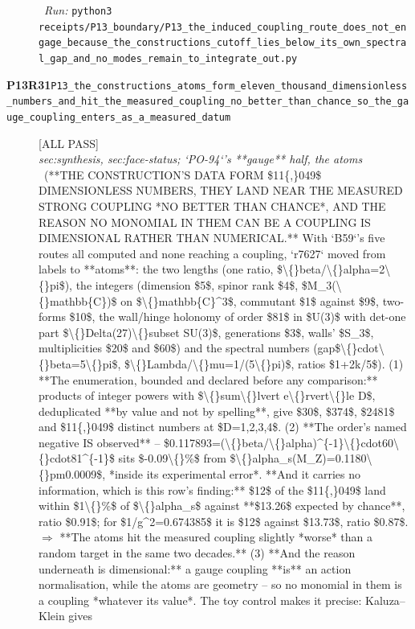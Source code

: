\begin{description}
\ \emph{Run:} \texttt{python3 receipts/P13\_boundary/P13\_the\_induced\_coupling\_route\_does\_not\_engage\_because\_the\_constructions\_cutoff\_lies\_below\_its\_own\_spectral\_gap\_and\_no\_modes\_remain\_to\_integrate\_out.py}
\item[\rcptlabel{P13_the_constructions_atoms_form_eleven_thousand_dimensionless_numbers_and_hit_the_measured_coupling_no_better_than_chance_so_the_gauge_coupling_enters_as_a_measured_datum}{P13R31}\textbf{P13R31}\quad\texttt{P13\_the\_constructions\_atoms\_form\_eleven\_thousand\_dimensionless\_numbers\_and\_hit\_the\_measured\_coupling\_no\_better\_than\_chance\_so\_the\_gauge\_coupling\_enters\_as\_a\_measured\_datum}]\hfill\textsf{[ALL PASS]}\\
\textit{sec:synthesis, sec:face-status; `PO-94`'s **gauge** half, the atoms} \ (**THE CONSTRUCTION'S DATA FORM \$11\{,\}049\$ DIMENSIONLESS NUMBERS, THEY LAND NEAR THE MEASURED STRONG COUPLING *NO BETTER THAN CHANCE*, AND THE REASON NO MONOMIAL IN THEM CAN BE A COUPLING IS DIMENSIONAL RATHER THAN NUMERICAL.** With `B59`'s five routes all computed and none reaching a coupling, `r7627` moved from labels to **atoms**: the two lengths (one ratio, \$\textbackslash\{\}beta/\textbackslash\{\}alpha=2\textbackslash\{\}pi\$), the integers (dimension \$5\$, spinor rank \$4\$, \$M\_3(\textbackslash\{\}mathbb\{C\})\$ on \$\textbackslash\{\}mathbb\{C\}\textasciicircum{}3\$, commutant \$1\$ against \$9\$, two-forms \$10\$, the wall/hinge holonomy of order \$81\$ in \$U(3)\$ with det-one part \$\textbackslash\{\}Delta(27)\textbackslash\{\}subset SU(3)\$, generations \$3\$, walls' \$S\_3\$, multiplicities \$20\$ and \$60\$) and the spectral numbers (gap\$\textbackslash\{\}cdot\textbackslash\{\}beta=5\textbackslash\{\}pi\$, \$\textbackslash\{\}Lambda/\textbackslash\{\}mu=1/(5\textbackslash\{\}pi)\$, ratios \$1+2k/5\$). (1) **The enumeration, bounded and declared before any comparison:** products of integer powers with \$\textbackslash\{\}sum\textbackslash\{\}lvert e\textbackslash\{\}rvert\textbackslash\{\}le D\$, deduplicated **by value and not by spelling**, give \$30\$, \$374\$, \$2481\$ and \$11\{,\}049\$ distinct numbers at \$D=1,2,3,4\$. (2) **The order's named negative IS observed** -- \$0.117893=(\textbackslash\{\}beta/\textbackslash\{\}alpha)\textasciicircum{}\{-1\}\textbackslash\{\}cdot60\textbackslash\{\}cdot81\textasciicircum{}\{-1\}\$ sits \$-0.09\textbackslash\{\}\%\$ from \$\textbackslash\{\}alpha\_s(M\_Z)=0.1180\textbackslash\{\}pm0.0009\$, *inside its experimental error*.  **And it carries no information, which is this row's finding:** \$12\$ of the \$11\{,\}049\$ land within \$1\textbackslash\{\}\%\$ of \$\textbackslash\{\}alpha\_s\$ against **\$13.26\$ expected by chance**, ratio \$0.91\$; for \$1/g\textasciicircum{}2=0.674385\$ it is \$12\$ against \$13.73\$, ratio \$0.87\$. \ensuremath{\Rightarrow} **The atoms hit the measured coupling slightly *worse* than a random target in the same two decades.** (3) **And the reason underneath is dimensional:** a gauge coupling **is** an action normalisation, while the atoms are geometry -- so no monomial in them is a coupling *whatever its value*. The toy control makes it precise: Kaluza--Klein gives 
\end{description}
